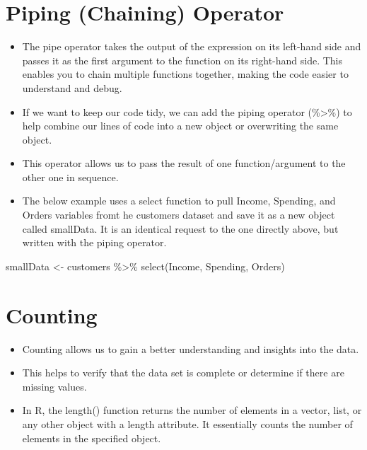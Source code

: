 \documentclass[
  letterpaper,
  DIV=11,
  numbers=noendperiod]{scrreprt}
\newenvironment{Shaded}{\begin{snugshade}}{\end{snugshade}}
\newcommand{\FunctionTok}[1]{\textcolor[rgb]{0.28,0.35,0.67}{#1}}
\newcommand{\NormalTok}[1]{\textcolor[rgb]{0.00,0.23,0.31}{#1}}
\newcommand{\OtherTok}[1]{\textcolor[rgb]{0.00,0.23,0.31}{#1}}
\newcommand{\SpecialCharTok}[1]{\textcolor[rgb]{0.37,0.37,0.37}{#1}}
\providecommand{\tightlist}{%
  \setlength{\itemsep}{0pt}\setlength{\parskip}{0pt}}\usepackage{longtable,booktabs,array}
\begin{document}
\chapter{Piping (Chaining) Operator}\label{piping-chaining-operator}

\begin{itemize}
\tightlist
\item
  The pipe operator takes the output of the expression on its left-hand
  side and passes it as the first argument to the function on its
  right-hand side. This enables you to chain multiple functions
  together, making the code easier to understand and debug.
\item
  If we want to keep our code tidy, we can add the piping operator
  (\%\textgreater\%) to help combine our lines of code into a new object
  or overwriting the same object.
\item
  This operator allows us to pass the result of one function/argument to
  the other one in sequence.
\item
  The below example uses a select function to pull Income, Spending, and
  Orders variables fromt he customers dataset and save it as a new
  object called smallData. It is an identical request to the one
  directly above, but written with the piping operator.
\end{itemize}

\begin{Shaded}
\begin{Highlighting}[]
\NormalTok{smallData }\OtherTok{\textless{}{-}}\NormalTok{ customers }\SpecialCharTok{\%\textgreater{}\%}
    \FunctionTok{select}\NormalTok{(Income, Spending, Orders)}
\end{Highlighting}
\end{Shaded}


\chapter{Counting}\label{counting}

\begin{itemize}
\item
  Counting allows us to gain a better understanding and insights into
  the data.
\item
  This helps to verify that the data set is complete or determine if
  there are missing values.
\item
  In R, the length() function returns the number of elements in a
  vector, list, or any other object with a length attribute. It
  essentially counts the number of elements in the specified object.
\end{itemize}
\end{document}

